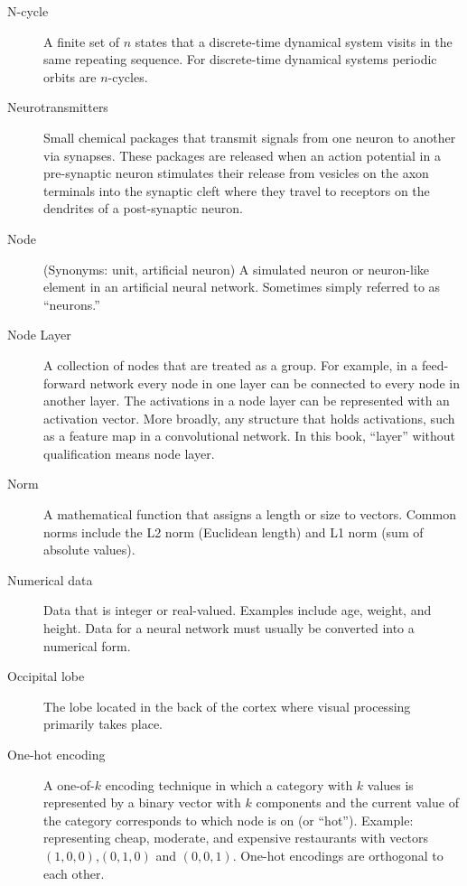 \begin{description}
\item[N-cycle] A finite set of $n$ states that a discrete-time dynamical system visits in the same repeating sequence. For discrete-time dynamical systems periodic orbits are $n$-cycles.


\item[Neurotransmitters] Small chemical packages that transmit signals from one neuron to another via synapses. These packages are released when an action potential in a pre-synaptic neuron stimulates their release from vesicles on the axon terminals into the synaptic cleft where they travel to receptors on the dendrites of a post-synaptic neuron.

\item[Node] (Synonyms: unit, artificial neuron) A simulated neuron or neuron-like element in an artificial neural network.  Sometimes simply referred to as ``neurons.''

\item[Node Layer] A collection of nodes that are treated as a group. For example, in a feed-forward network every node in one layer can be connected to every node in another layer. The activations in a node layer can be represented with an activation vector. More broadly, any structure that holds activations, such as a feature map in a convolutional network. In this book, ``layer'' without qualification means node layer.

\item[Norm] A mathematical function that assigns a length or size to vectors. Common norms include the L2 norm (Euclidean length) and L1 norm (sum of absolute values).

\item[Numerical data] Data that is integer or real-valued. Examples include age, weight, and height. Data for a neural network must usually be converted into a numerical form.

\item[Occipital lobe] The lobe located in the back of the cortex where visual processing primarily takes place.

\item[One-hot encoding] A one-of-$k$ encoding technique in which  a category with $k$ values is represented by a binary vector with $k$ components and the current value of the category corresponds to which node is on (or ``hot''). Example: representing cheap, moderate, and expensive restaurants with vectors $(1,0,0)$,$(0,1,0)$ and $(0,0,1)$. One-hot encodings are orthogonal to each other.


\end{description}
